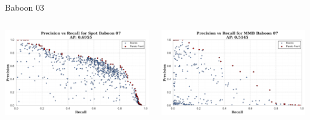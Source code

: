 \begin{frame}{Baboon 03}
    \begin{columns}
        \begin{column}{0.5\textwidth}
            \centering
            \includegraphics[width=\textwidth,keepaspectratio]{images/bom/precision_recall_Spot_Baboon_07.png}
        \end{column}
        \begin{column}{0.5\textwidth}
            \centering
            \includegraphics[width=\textwidth,keepaspectratio]{images/bom/precision_recall_MMB_Baboon_07.png}
        \end{column}
    \end{columns}
\end{frame}

